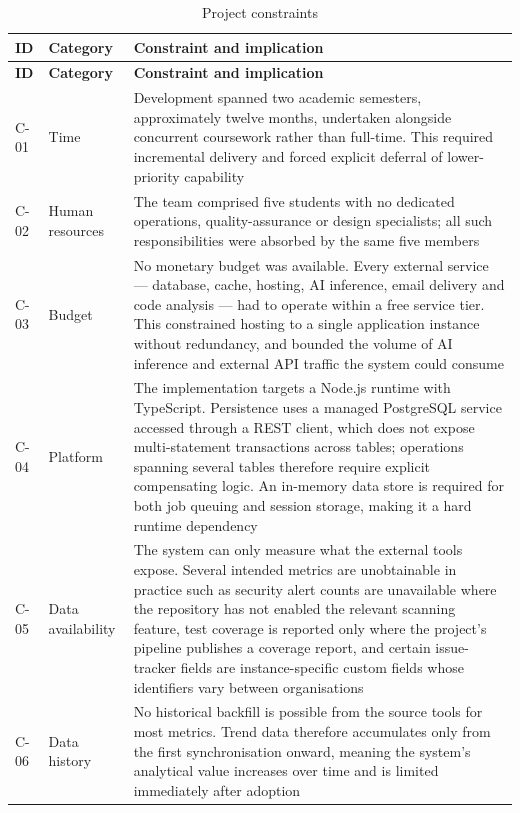 \begin{longtable}{
  >{\raggedright\arraybackslash}p{}
  >{\raggedright\arraybackslash}p{}
  >{\raggedright\arraybackslash}p{}
}
\caption{Project constraints}
\label{tab:constraints}\\
\toprule
\textbf{ID} & \textbf{Category} & \textbf{Constraint and implication} \\
\midrule
\endfirsthead
\toprule
\textbf{ID} & \textbf{Category} & \textbf{Constraint and implication} \\
\midrule
\endhead
\bottomrule
\endlastfoot
C-01 & Time & Development spanned two academic semesters, approximately twelve
months, undertaken alongside concurrent coursework rather than full-time. This
required incremental delivery and forced explicit deferral of lower-priority
capability \\
\addlinespace
C-02 & Human resources & The team comprised five students with no dedicated
operations, quality-assurance or design specialists; all such responsibilities were
absorbed by the same five members \\
\addlinespace
C-03 & Budget & No monetary budget was available. Every external service ---
database, cache, hosting, AI inference, email delivery and code analysis --- had to
operate within a free service tier. This constrained hosting to a single application
instance without redundancy, and bounded the volume of AI inference and external API
traffic the system could consume \\
\addlinespace
C-04 & Platform & The implementation targets a Node.js runtime with TypeScript.
Persistence uses a managed PostgreSQL service accessed through a REST client, which
does not expose multi-statement transactions across tables; operations spanning
several tables therefore require explicit compensating logic. An in-memory data store
is required for both job queuing and session storage, making it a hard runtime
dependency \\
\addlinespace
C-05 & Data availability & The system can only measure what the external tools
expose. Several intended metrics are unobtainable in practice such as security alert counts
are unavailable where the repository has not enabled the relevant scanning feature,
test coverage is reported only where the project's pipeline publishes a coverage
report, and certain issue-tracker fields are instance-specific custom fields whose
identifiers vary between organisations \\
\addlinespace
C-06 & Data history & No historical backfill is possible from the source tools for most metrics. Trend data therefore accumulates only from the first synchronisation onward, meaning the system's analytical value increases over time and is limited immediately after adoption \\

\end{longtable}
